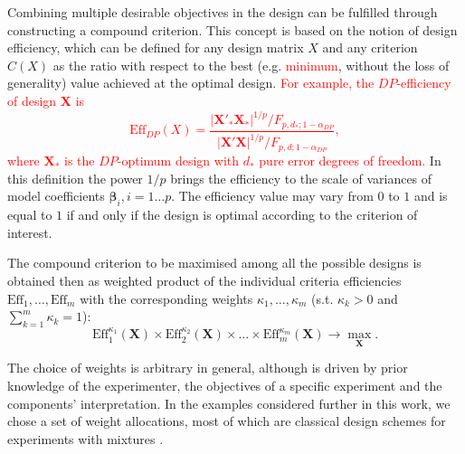 \documentclass[11pt]{article}
\newcommand{\highlight}{\textcolor{red}}
\begin{document}
Combining multiple desirable objectives in the design can be fulfilled through constructing a compound criterion. This concept is based on the notion of design efficiency, which can be defined for any design matrix $X$ and any criterion $C(X)$ as the ratio with respect to the best (e.g. \highlight{minimum}, without the loss of generality) value achieved at the optimal design. \highlight{For example, the $DP$-efficiency of design $\bm{X}$ is
\begin{equation*}
\mbox{Eff}_{DP}(X)=\frac{\vert \bm{X}'_{*}\bm{X}_{*}\vert^{1/p}/F_{p,d_{*};1-\alpha_{DP}}}{\vert \bm{X}'\bm{X}\vert^{1/p}/F_{p,d;1-\alpha_{DP}}},
\end{equation*}   
where $\bm{X}_{*}$ is the $DP$-optimum design with $d_{*}$ pure error degrees of freedom.} In this definition the power $1/p$ brings the efficiency to the scale of variances of model coefficients $\bm{\beta}_{i}, i=1\ldots p.$ The efficiency value may vary from $0$ to $1$ and is equal to $1$ if and only if the design is optimal according to the criterion of interest.

The compound criterion to be maximised among all the possible designs is obtained then as weighted product of the individual criteria efficiencies $\mbox{Eff}_{1},\ldots, \mbox{Eff}_{m}$ with the corresponding weights $\kappa_{1},\ldots ,\kappa_{m}$ (s.t. $\kappa_{k}>0$ and $\sum_{k=1}^{m}\kappa_{k}=1$):
\begin{equation}
\label{eq::compound}
\mbox{Eff}^{\kappa_{1}}_{1}(\bm{X})\times\mbox{Eff}^{\kappa_{2}}_{2}(\bm{X})\times\ldots\times\mbox{Eff}^{\kappa_{m}}_{m}(\bm{X})\rightarrow \underset{\bm{X}}\max.
\end{equation}

The choice of weights is arbitrary in general, although is driven by prior knowledge of the experimenter, the objectives of a specific experiment and the components' interpretation. In the examples considered further in this work, we chose a set of weight allocations, most of which are  classical design schemes for experiments with mixtures \citep{Cornell2011Mixtures}. 

\end{document}
